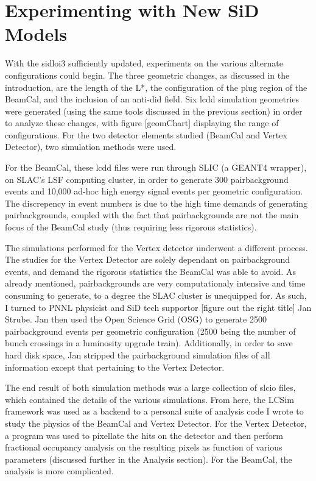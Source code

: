 \documentclass{report}
\begin{document}
        \section{Experimenting with New SiD Models}

            With the sidloi3 sufficiently updated, experiments on the various alternate configurations could begin. The three geometric changes, as discussed in the introduction, are the length of the L*, the configuration of the plug region of the BeamCal, and the inclusion of an anti-did field. Six lcdd simulation geometries were generated (using the same tools discussed in the previous section) in order to analyze these changes, with figure [geomChart] displaying the range of configurations. For the two detector elements studied (BeamCal and Vertex Detector), two simulation methods were used. 
            
            For the BeamCal, these lcdd files were run through SLIC (a GEANT4 wrapper), on SLAC's LSF computing cluster, in order to generate 300 pairbackground events and 10,000 ad-hoc high energy signal events per geometric configuration. The discrepency in event numbers is due to the high time demands of generating pairbackgrounds, coupled with the fact that pairbackgrounds are not the main focus of the BeamCal study (thus requiring less rigorous statistics).

            The simulations performed for the Vertex detector underwent a different process. The studies for the Vertex Detector are solely dependant on pairbackground events, and demand the rigorous statistics the BeamCal was able to avoid. As already mentioned, pairbackgrounds are very computationaly intensive and time consuming to generate, to a degree the SLAC cluster is unequipped for. As such, I turned to PNNL physicist and SiD tech supportor [figure out the right title] Jan Strube. Jan then used the Open Science Grid (OSG) to generate 2500 pairbackground events per geometric configuration (2500 being the number of bunch crossings in a luminosity upgrade train). Additionally, in order to save hard disk space, Jan stripped the pairbackground simulation files of all information except that pertaining to the Vertex Detector. 

            The end result of both simulation methods was a large collection of slcio files, which contained the details of the various simulations. From here, the LCSim framework was used as a backend to a personal suite of analysis code I wrote to study the physics of the BeamCal and Vertex Detector. For the Vertex Detector, a program was used to pixellate the hits on the detector and then perform fractional occupancy analysis on the resulting pixels as function of various parameters (discussed further in the Analysis section). For the BeamCal, the analysis is more complicated.
            
\end{document}
